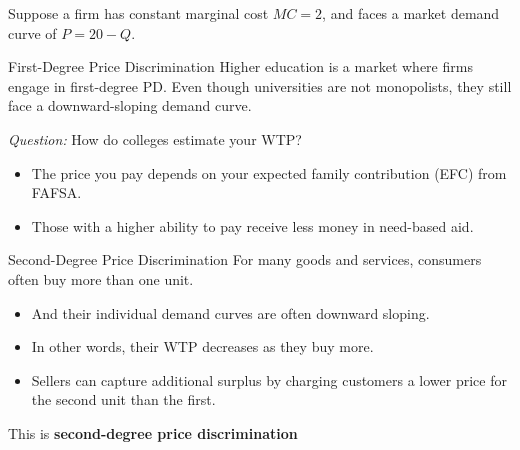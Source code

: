 \documentclass[11pt,t]{beamer}
\begin{document}
\begin{frame}{}
  Suppose a firm has constant marginal cost $MC = 2$, and faces a market demand curve of $P = 20 - Q$. 
\end{frame}

\begin{frame}{First-Degree Price Discrimination}
  Higher education is a market where firms engage in first-degree PD. Even though universities are not monopolists, they still face a downward-sloping demand curve.

  \bigskip
  \emph{Question:} How do colleges estimate your WTP?

  \pause
  \begin{itemize}
    \item The price you pay depends on your expected family contribution (EFC) from FAFSA.
    
    \item Those with a higher ability to pay receive less money in need-based aid.
  \end{itemize}

\end{frame}

\begin{frame}{Second-Degree Price Discrimination}
  For many goods and services, consumers often buy more than one unit.

  \begin{itemize}
    \item And their individual demand curves are often downward sloping.
    
    \item In other words, their WTP decreases as they buy more.
    
    \item Sellers can capture additional surplus by charging customers a lower price for the second unit than the first.
  \end{itemize}

  \bigskip
  This is \textbf{second-degree price discrimination}
\end{frame}
\end{document}
